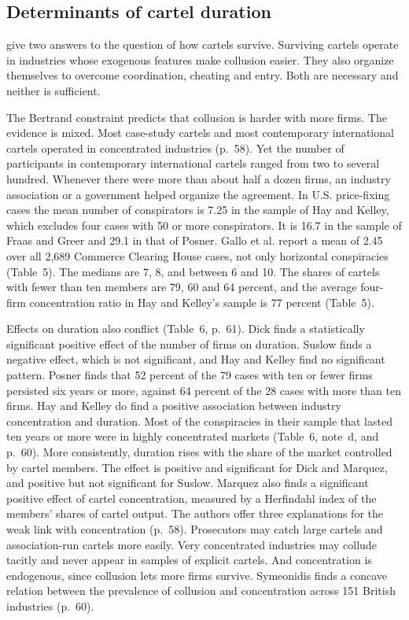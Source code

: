 \subsection{Determinants of cartel duration}\label{sec:12-ls-determinants}

\citet[p.~57]{LevensteinSuslow2006} give two answers to the question of how cartels survive. Surviving cartels operate
in industries whose exogenous features make collusion easier. They also organize themselves to overcome
coordination, cheating and entry. Both are necessary and neither is sufficient.

The Bertrand constraint predicts that collusion is harder with more firms. The evidence is mixed. Most case-study
cartels and most contemporary international cartels operated in concentrated industries (p.~58). Yet the number of
participants in contemporary international cartels ranged from two to several hundred. Whenever there were more than
about half a dozen firms, an industry association or a government helped organize the agreement. In U.S. price-fixing
cases the mean number of conspirators is 7.25 in the sample of Hay and Kelley, which excludes four cases with 50 or more
conspirators. It is 16.7 in the sample of Fraas and Greer and 29.1 in that of Posner. Gallo et al. report a mean of 2.45 over all
2,689 Commerce Clearing House cases, not only horizontal conspiracies (Table~5). The medians are 7, 8, and
between 6 and 10. The shares of cartels with fewer than ten members are 79, 60 and 64 percent, and the average four-firm
concentration ratio in Hay and Kelley's sample is 77 percent (Table~5).

Effects on duration also conflict (Table~6, p.~61). Dick finds a statistically significant positive effect of the
number of firms on duration. Suslow finds a negative effect, which is not significant, and Hay and Kelley find no
significant pattern. Posner finds that 52 percent of the 79 cases with ten or fewer firms persisted six years or more,
against 64 percent of the 28 cases with more than ten firms. Hay and Kelley do find a positive association between
industry concentration and duration. Most of the conspiracies in their sample that lasted ten years or more were in
highly concentrated markets (Table~6, note~d, and p.~60). More consistently, duration rises with the share of the
market controlled by cartel members. The effect is positive and significant for Dick and Marquez, and positive but
not significant for Suslow. Marquez also finds a significant positive effect of cartel concentration, measured by a
Herfindahl index of the members' shares of cartel output. The authors offer three explanations for the weak link with concentration
(p.~58). Prosecutors may catch large cartels and association-run cartels more easily. Very concentrated industries may
collude tacitly and never appear in samples of explicit cartels. And concentration is endogenous, since collusion lets
more firms survive. Symeonidis finds a concave relation between the prevalence of collusion and concentration across
151 British industries (p.~60).

